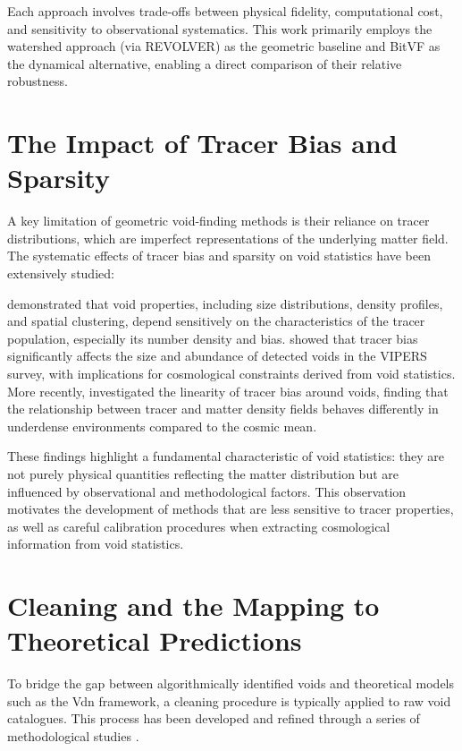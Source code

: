\documentclass[12pt]{report}
\begin{document}
Each approach involves trade-offs between physical fidelity, computational cost, and sensitivity to observational systematics. This work primarily employs the watershed approach (via REVOLVER) as the geometric baseline and BitVF as the dynamical alternative, enabling a direct comparison of their relative robustness.


\section{The Impact of Tracer Bias and Sparsity}

A key limitation of geometric void-finding methods is their reliance on tracer distributions, which are imperfect representations of the underlying matter field. The systematic effects of tracer bias and sparsity on void statistics have been extensively studied:

\citet{Nadathur2015a} demonstrated that void properties, including size distributions, density profiles, and spatial clustering, depend sensitively on the characteristics of the tracer population, especially its number density and bias. \citet{Contarini2019} showed that tracer bias significantly affects the size and abundance of detected voids in the VIPERS survey, with implications for cosmological constraints derived from void statistics. More recently, \citet{Pollina2019} investigated the linearity of tracer bias around voids, finding that the relationship between tracer and matter density fields behaves differently in underdense environments compared to the cosmic mean.

These findings highlight a fundamental characteristic of void statistics: they are not purely physical quantities reflecting the matter distribution but are influenced by observational and methodological factors. This observation motivates the development of methods that are less sensitive to tracer properties, as well as careful calibration procedures when extracting cosmological information from void statistics.


\section{Cleaning and the Mapping to Theoretical Predictions}

To bridge the gap between algorithmically identified voids and theoretical models such as the Vdn framework, a cleaning procedure is typically applied to raw void catalogues. This process has been developed and refined through a series of methodological studies \citep{Ronconi2017,Ronconi2019,Contarini2019,Contarini2023,Sartori2025}.
\end{document}
